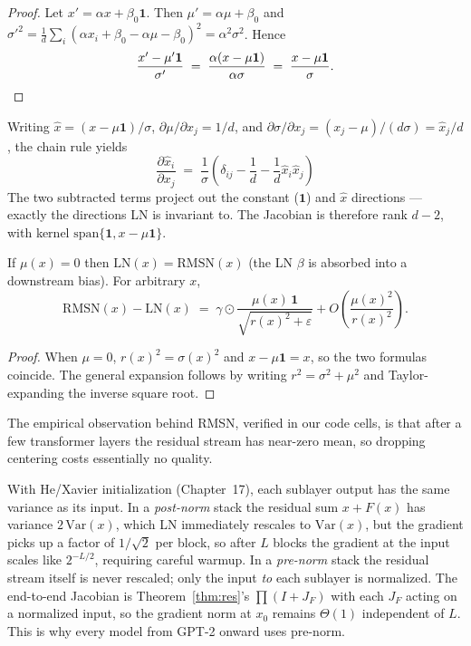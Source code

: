 \begin{proof}
Let $x' = \alpha x + \beta_0 \mathbf{1}$. Then $\mu' = \alpha \mu + \beta_0$ and $\sigma'^2 = \tfrac1d \sum_i (\alpha x_i + \beta_0 - \alpha \mu - \beta_0)^2 = \alpha^2 \sigma^2$. Hence
\[
  \frac{x' - \mu' \mathbf{1}}{\sigma'} \;=\; \frac{\alpha (x - \mu \mathbf{1})}{\alpha \sigma} \;=\; \frac{x - \mu \mathbf{1}}{\sigma}. \qedhere
\]
\end{proof}

Writing $\hat x = (x - \mu \mathbf{1})/\sigma$, $\partial \mu/\partial x_j = 1/d$, and $\partial \sigma / \partial x_j = (x_j - \mu)/(d \sigma) = \hat x_j / d$, the chain rule yields
\[
  \boxed{\;\frac{\partial \hat x_i}{\partial x_j} \;=\; \frac{1}{\sigma}\!\left(\delta_{ij} - \frac{1}{d} - \frac{1}{d}\hat x_i \hat x_j\right)\;}
\]
The two subtracted terms project out the constant ($\mathbf 1$) and $\hat x$ directions --- exactly the directions LN is invariant to. The Jacobian is therefore rank $d - 2$, with kernel $\mathrm{span}\{\mathbf{1}, x - \mu \mathbf{1}\}$.

\begin{proposition}
If $\mu(x) = 0$ then $\mathrm{LN}(x) = \mathrm{RMSN}(x)$ (the LN $\beta$ is absorbed into a downstream bias). For arbitrary $x$,
\[
  \mathrm{RMSN}(x) - \mathrm{LN}(x) \;=\; \gamma \odot \frac{\mu(x)\,\mathbf 1}{\sqrt{r(x)^2 + \varepsilon}} + O\!\left(\frac{\mu(x)^2}{r(x)^2}\right).
\]
\end{proposition}

\begin{proof}
When $\mu = 0$, $r(x)^2 = \sigma(x)^2$ and $x - \mu \mathbf{1} = x$, so the two formulas coincide. The general expansion follows by writing $r^2 = \sigma^2 + \mu^2$ and Taylor-expanding the inverse square root.
\end{proof}

The empirical observation behind RMSN, verified in our code cells, is that after a few transformer layers the residual stream has near-zero mean, so dropping centering costs essentially no quality.

\begin{remark}
With He/Xavier initialization (Chapter~17), each sublayer output has the same variance as its input. In a \emph{post-norm} stack the residual sum $x + F(x)$ has variance $2\,\mathrm{Var}(x)$, which LN immediately rescales to $\mathrm{Var}(x)$, but the gradient picks up a factor of $1/\sqrt 2$ per block, so after $L$ blocks the gradient at the input scales like $2^{-L/2}$, requiring careful warmup. In a \emph{pre-norm} stack the residual stream itself is never rescaled; only the input \emph{to} each sublayer is normalized. The end-to-end Jacobian is Theorem~\ref{thm:res}'s $\prod(I + J_F)$ with each $J_F$ acting on a normalized input, so the gradient norm at $x_0$ remains $\Theta(1)$ independent of $L$. This is why every model from GPT-2 onward uses pre-norm.
\end{remark}

